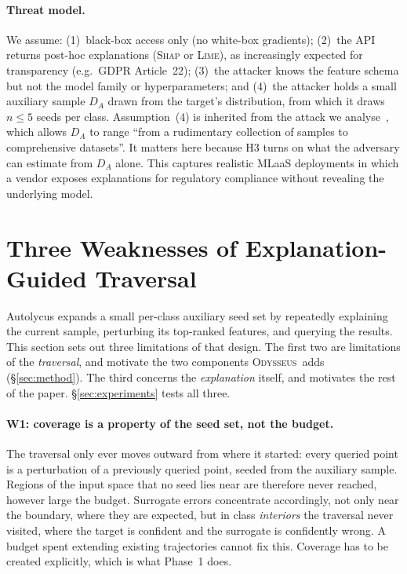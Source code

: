 \documentclass[sigconf,anonymous,review]{acmart}
\newcommand{\sys}{\textsc{Odysseus}}
\begin{document}
\paragraph{Threat model.}
We assume: (1)~black-box access only (no white-box gradients); (2)~the API returns
post-hoc explanations (\textsc{Shap} or \textsc{Lime}), as increasingly expected for
transparency (e.g.\ GDPR Article~22); (3)~the attacker knows the feature schema but
not the model family or hyperparameters; and (4)~the attacker holds a small auxiliary
sample $D_A$ drawn from the target's distribution, from which it draws $n{\le}5$ seeds per
class. Assumption~(4) is inherited from the attack we analyse~\cite{oksuz2024autolycus},
which allows $D_A$ to range ``from a rudimentary collection of samples to comprehensive datasets''. It matters here because H3 turns on what the adversary can estimate from $D_A$
alone. This captures realistic MLaaS deployments in which a vendor exposes explanations for
regulatory compliance without revealing the underlying model.

\section{Three Weaknesses of Explanation-Guided Traversal}
\label{sec:analysis}
Autolycus expands a small per-class auxiliary seed set by repeatedly explaining the current sample,
perturbing its top-ranked features, and querying the results. This section sets out three limitations
of that design. The first two are limitations of the \emph{traversal}, and motivate the two components
\sys\ adds (\S\ref{sec:method}). The third concerns the \emph{explanation} itself, and motivates the
rest of the paper. \S\ref{sec:experiments} tests all three.

\paragraph{W1: coverage is a property of the seed set, not the budget.}
The traversal only ever moves outward from where it started: every queried point is a perturbation of
a previously queried point, seeded from the auxiliary sample. Regions of the input space that no seed
lies near are therefore never reached, however large the budget. Surrogate errors concentrate accordingly, not only near the boundary, where they are expected, but in class \emph{interiors} the
traversal never visited, where the target is confident and the surrogate is confidently wrong. A
budget spent extending existing trajectories cannot fix this. Coverage has to be created explicitly,
which is what Phase~1 does.
\end{document}

